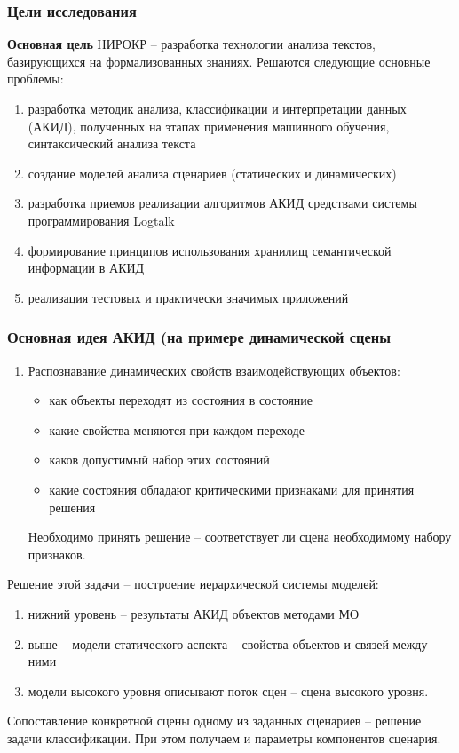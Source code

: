 \documentclass[10pt]{beamer}
\begin{document}
\begin{frame}
  \frametitle{Цели исследования}
  \textbf{Основная цель} НИРОКР -- разработка технологии анализа текстов, базирующихся на формализованных знаниях. Решаются следующие основные проблемы:
  \begin{enumerate}
  \item разработка методик анализа, классификации и интерпретации данных (АКИД), полученных на этапах применения машинного обучения, синтаксический анализа текста
  \item создание моделей анализа сценариев (статических и динамических) %
  \item разработка приемов реализации алгоритмов АКИД средствами системы программирования Logtalk
  \item формирование принципов использования хранилищ семантической информации в АКИД
  \item реализация тестовых и практически значимых приложений
  \end{enumerate}
\end{frame}
\begin{frame}
  \frametitle{Основная идея АКИД (на примере динамической сцены}
  \begin{enumerate}
  \item Распознавание динамических свойств взаимодействующих объектов:
    \begin{itemize}
    \item как объекты переходят из состояния в состояние
    \item какие свойства меняются при каждом переходе
    \item каков допустимый набор этих состояний
    \item какие состояния обладают критическими признаками для принятия решения
    \end{itemize}
   Необходимо принять решение -- соответствует ли сцена необходимому набору признаков.
  \end{enumerate}

  Решение этой задачи -- построение иерархической системы моделей:
  \begin{enumerate}
  \item нижний уровень -- результаты АКИД объектов методами МО
  \item выше -- модели статического аспекта -- свойства объектов и связей между ними
  \item модели высокого уровня описывают поток сцен -- сцена высокого уровня.
  \end{enumerate}

Сопоставление конкретной сцены одному из заданных сценариев -- решение задачи классификации. При этом получаем и параметры компонентов сценария.
\end{frame}
\end{document}
